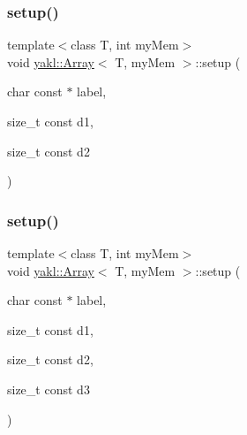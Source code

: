 \mbox{\label{classyakl_1_1Array_a70c7126b0e020098de46dd7c296c6f24}} 
\subsubsection{\texorpdfstring{setup()}{setup()}\hspace{0.1cm}{\footnotesize\ttfamily [2/8]}}
{\footnotesize\ttfamily template$<$class T, int my\+Mem$>$ \\
void \hyperlink{classyakl_1_1Array}{yakl\+::\+Array}$<$ T, my\+Mem $>$\+::setup (\begin{DoxyParamCaption}\item[{char const $\ast$}]{label,  }\item[{size\+\_\+t const}]{d1,  }\item[{size\+\_\+t const}]{d2 }\end{DoxyParamCaption})\hspace{0.3cm}{\ttfamily [inline]}}

\mbox{\label{classyakl_1_1Array_a697987a31846b4705f56f00759c15a82}} 
\subsubsection{\texorpdfstring{setup()}{setup()}\hspace{0.1cm}{\footnotesize\ttfamily [3/8]}}
{\footnotesize\ttfamily template$<$class T, int my\+Mem$>$ \\
void \hyperlink{classyakl_1_1Array}{yakl\+::\+Array}$<$ T, my\+Mem $>$\+::setup (\begin{DoxyParamCaption}\item[{char const $\ast$}]{label,  }\item[{size\+\_\+t const}]{d1,  }\item[{size\+\_\+t const}]{d2,  }\item[{size\+\_\+t const}]{d3 }\end{DoxyParamCaption})\hspace{0.3cm}{\ttfamily [inline]}}

\mbox{\label{classyakl_1_1Array_ae5ca69f311d52f2c30653d2d0a7d6e0d}} 
